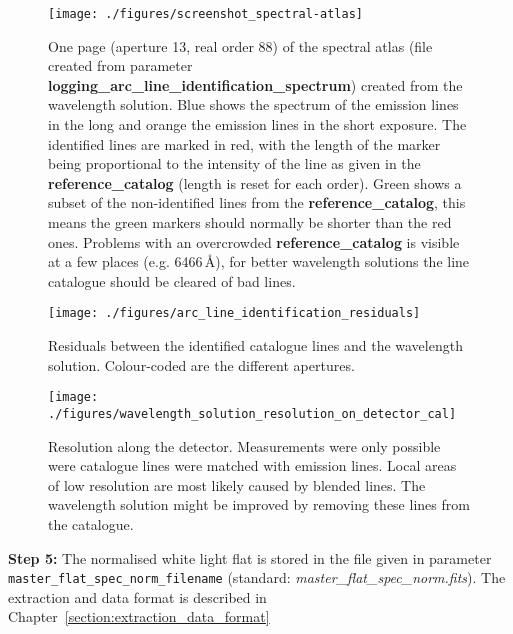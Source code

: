 \documentclass[10pt,a4paper]{article}
\begin{document}
\begin{figure} 
  \begin{center}
    \texttt{[image: ./figures/screenshot\_spectral-atlas]}
  \end{center} 
  \caption{One page (aperture 13, real order 88) of the spectral atlas (file created from parameter \textbf{logging\_arc\_line\_identification\_spectrum}) created from the wavelength solution. Blue shows the spectrum of the emission lines in the long and orange the emission lines in the short exposure. The identified lines are marked in red, with the length of the marker being proportional to the intensity of the line as given in the \textbf{reference\_catalog} (length is reset for each order). Green shows a subset of the non-identified lines from the \textbf{reference\_catalog}, this means the green markers should normally be shorter than the red ones. Problems with an overcrowded \textbf{reference\_catalog} is visible at a few places (e.g. 6466\,\AA), for better wavelength solutions the line catalogue should be cleared of bad lines.
    \label{figure_arc_line_identification_spectrum}}
\end{figure}


\begin{figure} 
  \begin{center}
    \texttt{[image: ./figures/arc\_line\_identification\_residuals]}
  \end{center} 
  \caption{Residuals between the identified catalogue lines and the wavelength solution. Colour-coded are the different apertures.
    \label{figure_arc_line_identification_residuals}}
\end{figure}

\begin{figure} 
  \begin{center}
    \texttt{[image: ./figures/wavelength\_solution\_resolution\_on\_detector\_cal]}
  \end{center} 
  \caption{Resolution along the detector. Measurements were only possible were catalogue lines were matched with emission lines. Local areas of low resolution are most likely caused by blended lines. The wavelength solution might be improved by removing these lines from the catalogue.
    \label{figure_wavelength_solution_resolution}}
\end{figure}



\vspace{0.5em}\noindent \textbf{Step 5:} The normalised white light flat is stored in the file given in parameter \verb|master_flat_spec_norm_filename| (standard: \textit{master\_flat\_spec\_norm.fits}). The extraction and data format is described in Chapter~\ref{section:extraction_data_format}
\end{document}
